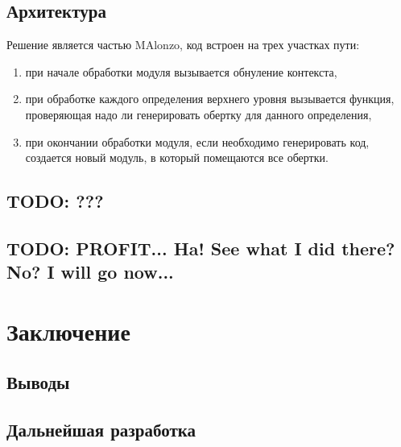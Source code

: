\subsection{Архитектура}



Решение является частью MAlonzo, код встроен на трех участках пути:
\begin{enumerate}
\item при начале обработки модуля вызывается обнуление контекста,
\item при обработке каждого определения верхнего уровня вызывается
      функция, проверяющая надо ли генерировать обертку для данного определения,
\item при окончании обработки модуля, если необходимо генерировать код, создается
      новый модуль, в который помещаются все обертки.
\end{enumerate}

\subsection{TODO: ???}

\subsection{TODO: PROFIT... Ha! See what I did there? No? I will go now...}

\newpage
\section{Заключение}

\subsection{Выводы}

\subsection{Дальнейшая разработка}
